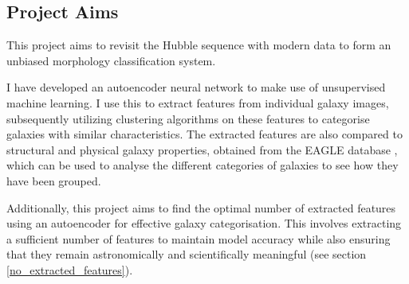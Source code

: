 \documentclass[12pt, onecolumn]{article}
\begin{document}
        

        

        
    
        

    \subsection{Project Aims}

        This project aims to revisit the Hubble sequence with modern data to form an unbiased morphology classification system.
        
        I have developed an autoencoder neural network to make use of unsupervised machine learning. I use this to extract features from individual galaxy images, subsequently utilizing clustering algorithms on these features to categorise galaxies with similar characteristics. The extracted features are also compared to structural and physical galaxy properties, obtained from the EAGLE database \cite{eagle_catalogue_public_release}, which can be used to analyse the different categories of galaxies to see how they have been grouped.

        Additionally, this project aims to find the optimal number of extracted features using an autoencoder for effective galaxy categorisation. This involves extracting a sufficient number of features to maintain model accuracy while also ensuring that they remain astronomically and scientifically meaningful (see section \ref{no_extracted_features}).
\end{document}

